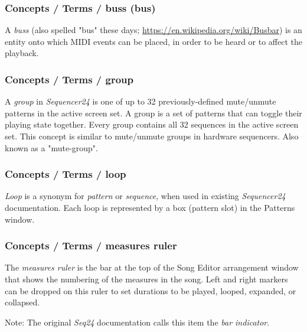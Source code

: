 \subsubsection{Concepts / Terms / buss (bus)}
\label{subsubsec:concepts_terms_buss}

   A \textsl{buss} (also spelled "bus" these days;
   \url{https://en.wikipedia.org/wiki/Busbar}) is an entity onto which
   MIDI events can be placed, in order to be heard or to affect the
   playback.

\subsubsection{Concepts / Terms / group}
\label{subsubsec:concepts_terms_group}

   A \textsl{group} in \textsl{Sequencer24} is one of up to 32
   previously-defined mute/unmute patterns in the active screen set.
   A group is a set of patterns that can toggle their playing state
   together.  Every group contains all 32 sequences in the active screen
   set.  This concept is similar to mute/unmute groups in hardware
   sequencers.
   Also known as a "mute-group".

\subsubsection{Concepts / Terms / loop}
\label{subsubsec:concepts_terms_loop}

   \textsl{Loop}
   is a synonym for \textsl{pattern} or \textsl{sequence}, when used
   in existing \textsl{Sequencer24} documentation.
   Each loop is represented by a box (pattern slot) in the Patterns window.

\subsubsection{Concepts / Terms / measures ruler}
\label{subsubsec:concepts_terms_measures_ruler}

   The \textsl{measures ruler} is the bar at the top of the Song Editor
   arrangement window that shows the numbering of the measures in the song.
   Left and right markers can be dropped on this ruler to set durations to
   be played, looped, expanded, or collapsed.

   Note:
   The original \textsl{Seq24} documentation calls this item the
   \textsl{bar indicator}.

